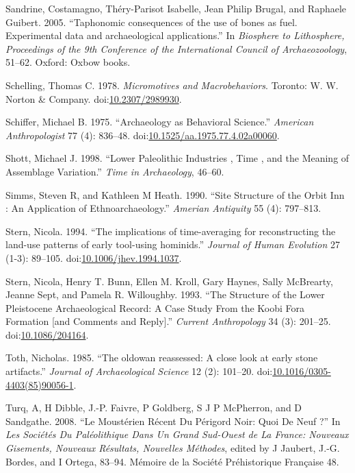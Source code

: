 \documentclass[smallextended]{svjour3}       %
\begin{document}
\hypertarget{ref-Sandrine2005}{}
Sandrine, Costamagno, Théry-Parisot Isabelle, Jean Philip Brugal, and
Raphaele Guibert. 2005. ``Taphonomic consequences of the use of bones as
fuel. Experimental data and archaeological applications.'' In
\emph{Biosphere to Lithosphere, Proceedings of the 9th Conference of the
International Council of Archaeozoology}, 51--62. Oxford: Oxbow books.

\hypertarget{ref-Schelling1978}{}
Schelling, Thomas C. 1978. \emph{Micromotives and Macrobehaviors}.
Toronto: W. W. Norton \& Company.
doi:\href{https://doi.org/10.2307/2989930}{10.2307/2989930}.

\hypertarget{ref-Schiffer1975}{}
Schiffer, Michael B. 1975. ``Archaeology as Behavioral Science.''
\emph{American Anthropologist} 77 (4): 836--48.
doi:\href{https://doi.org/10.1525/aa.1975.77.4.02a00060}{10.1525/aa.1975.77.4.02a00060}.

\hypertarget{ref-Shott1998}{}
Shott, Michael J. 1998. ``Lower Paleolithic Industries , Time , and the
Meaning of Assemblage Variation.'' \emph{Time in Archaeology}, 46--60.

\hypertarget{ref-Simms1990}{}
Simms, Steven R, and Kathleen M Heath. 1990. ``Site Structure of the
Orbit Inn : An Application of Ethnoarchaeology.'' \emph{Amerian
Antiquity} 55 (4): 797--813.

\hypertarget{ref-Stern1994}{}
Stern, Nicola. 1994. ``The implications of time-averaging for
reconstructing the land-use patterns of early tool-using hominids.''
\emph{Journal of Human Evolution} 27 (1-3): 89--105.
doi:\href{https://doi.org/10.1006/jhev.1994.1037}{10.1006/jhev.1994.1037}.

\hypertarget{ref-Stern1993}{}
Stern, Nicola, Henry T. Bunn, Ellen M. Kroll, Gary Haynes, Sally
McBrearty, Jeanne Sept, and Pamela R. Willoughby. 1993. ``The Structure
of the Lower Pleistocene Archaeological Record: A Case Study From the
Koobi Fora Formation {[}and Comments and Reply{]}.'' \emph{Current
Anthropology} 34 (3): 201--25.
doi:\href{https://doi.org/10.1086/204164}{10.1086/204164}.

\hypertarget{ref-Toth1985}{}
Toth, Nicholas. 1985. ``The oldowan reassessed: A close look at early
stone artifacts.'' \emph{Journal of Archaeological Science} 12 (2):
101--20.
doi:\href{https://doi.org/10.1016/0305-4403(85)90056-1}{10.1016/0305-4403(85)90056-1}.

\hypertarget{ref-jaubert_mousterien_2008}{}
Turq, A, H Dibble, J.-P. Faivre, P Goldberg, S J P McPherron, and D
Sandgathe. 2008. ``Le Moustérien Récent Du Périgord Noir: Quoi De Neuf
?'' In \emph{Les Sociétés Du Paléolithique Dans Un Grand Sud-Ouest de La
France: Nouveaux Gisements, Nouveaux Résultats, Nouvelles Méthodes},
edited by J Jaubert, J.-G. Bordes, and I Ortega, 83--94. Mémoire de la
Société Préhistorique Française 48.
\end{document}
